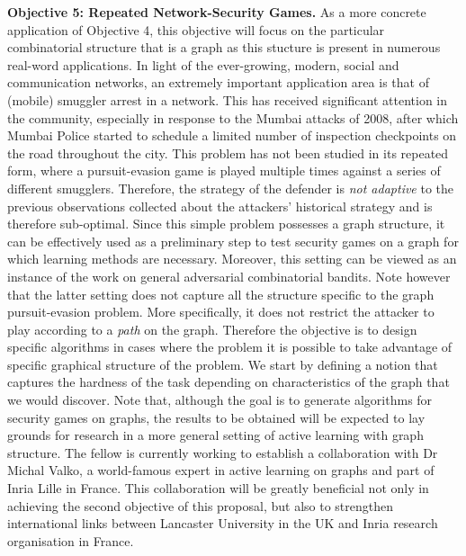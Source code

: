 \textbf{Objective 5:  Repeated Network-Security Games.}
As a more concrete application of Objective 4, this objective will focus on the particular combinatorial structure that is a graph as this stucture is present in  numerous real-word applications.
In light of the ever-growing, modern, social and communication networks, an extremely important application area is that of (mobile) smuggler arrest in a network\cite{jain2011double}. This has received significant attention in the community, especially in  response  to  the  Mumbai  attacks  of  2008, after which  Mumbai  Police
started to schedule a limited number of inspection checkpoints
on the road throughout the city. This problem has not been studied in its repeated form, where a pursuit-evasion game is played multiple times against a series of different smugglers. Therefore, the strategy of the defender is \textit{not adaptive} to the previous observations collected about the attackers' historical strategy and is therefore sub-optimal. Since this simple problem possesses a graph structure, it can be effectively used as a preliminary step to test security games on a graph for which learning methods are necessary. Moreover, this setting can be viewed as an instance of the work on general adversarial combinatorial bandits\cite{cesa2012combinatorial}. Note however that the latter setting does not capture all the structure specific to the graph pursuit-evasion problem. More specifically, it does not restrict the attacker to play according to a {\em path} on the graph. Therefore the objective  is to design specific algorithms in cases where the problem it is possible to take advantage of specific graphical structure of the problem. We start by defining a notion that captures the hardness of the task depending on characteristics of the graph that we would discover. Note that, although the goal is to generate algorithms for security games on graphs, the results to be obtained will be expected to lay grounds for research in a more general setting of active learning with graph structure. The fellow is currently working to establish a collaboration with Dr Michal Valko, a world-famous expert in active learning on graphs and part of Inria Lille in France. This collaboration will be greatly beneficial not only in achieving the second objective of this proposal, but also to strengthen international links between Lancaster University in the UK and Inria research organisation in France.  
 
 

